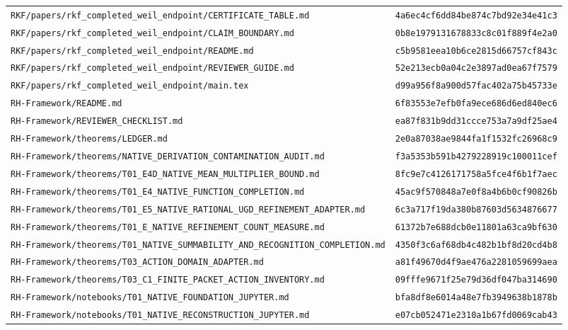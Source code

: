\documentclass[11pt,openany]{book}
\begin{document}
\begin{small}
\begin{longtable}{p{}p{}}
\texttt{RKF/papers/rkf\_completed\_weil\_endpoint/CERTIFICATE\_TABLE.md} & \texttt{4a6ec4cf6dd84be874c7bd92e34e41c3}\\
\texttt{RKF/papers/rkf\_completed\_weil\_endpoint/CLAIM\_BOUNDARY.md} & \texttt{0b8e1979131678833c8c01f889f4e2a0}\\
\texttt{RKF/papers/rkf\_completed\_weil\_endpoint/README.md} & \texttt{c5b9581eea10b6ce2815d66757cf843c}\\
\texttt{RKF/papers/rkf\_completed\_weil\_endpoint/REVIEWER\_GUIDE.md} & \texttt{52e213ecb0a04c2e3897ad0ea67f7579}\\
\texttt{RKF/papers/rkf\_completed\_weil\_endpoint/main.tex} & \texttt{d99a956f8a900d57fac402a75b45733e}\\
\texttt{RH-Framework/README.md} & \texttt{6f83553e7efb0fa9ece686d6ed840ec6}\\
\texttt{RH-Framework/REVIEWER\_CHECKLIST.md} & \texttt{ea87f831b9dd31ccce753a7a9df25ae4}\\
\texttt{RH-Framework/theorems/LEDGER.md} & \texttt{2e0a87038ae9844fa1f1532fc26968c9}\\
\texttt{RH-Framework/theorems/NATIVE\_DERIVATION\_CONTAMINATION\_AUDIT.md} & \texttt{f3a5353b591b4279228919c100011cef}\\
\texttt{RH-Framework/theorems/T01\_E4D\_NATIVE\_MEAN\_MULTIPLIER\_BOUND.md} & \texttt{8fc9e7c4126171758a5fce4f6b1f7aec}\\
\texttt{RH-Framework/theorems/T01\_E4\_NATIVE\_FUNCTION\_COMPLETION.md} & \texttt{45ac9f570848a7e0f8a4b6b0cf90826b}\\
\texttt{RH-Framework/theorems/T01\_E5\_NATIVE\_RATIONAL\_UGD\_REFINEMENT\_ADAPTER.md} & \texttt{6c3a717f19da380b87603d5634876677}\\
\texttt{RH-Framework/theorems/T01\_E\_NATIVE\_REFINEMENT\_COUNT\_MEASURE.md} & \texttt{61372b7e688dcb0e11801a63ca9bf630}\\
\texttt{RH-Framework/theorems/T01\_NATIVE\_SUMMABILITY\_AND\_RECOGNITION\_COMPLETION.md} & \texttt{4350f3c6af68db4c482b1bf8d20cd4b8}\\
\texttt{RH-Framework/theorems/T03\_ACTION\_DOMAIN\_ADAPTER.md} & \texttt{a81f49670d4f9ae476a2281059699aea}\\
\texttt{RH-Framework/theorems/T03\_C1\_FINITE\_PACKET\_ACTION\_INVENTORY.md} & \texttt{09fffe9671f25e79d36df047ba314690}\\
\texttt{RH-Framework/notebooks/T01\_NATIVE\_FOUNDATION\_JUPYTER.md} & \texttt{bfa8df8e6014a48e7fb3949638b1878b}\\
\texttt{RH-Framework/notebooks/T01\_NATIVE\_RECONSTRUCTION\_JUPYTER.md} & \texttt{e07cb052471e2310a1b67fd0069cab43}\\

\end{longtable}
\end{small}
\end{document}
